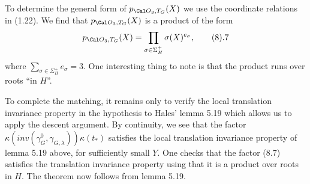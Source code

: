 To determine the general form of
$p_{{\Cal O}_3,T_G}(X)$ we use the coordinate relations in (1.22).
We find that $p_{{\Cal O}_3,T_G}(X)$ is a product of the form
$$
p_{{\Cal O}_3,T_G}(X)=\prod_{\sigma \in\Sigma_H^+}\sigma(X)^{e_\sigma},
\tag 8.7
$$
where $\sum_{\sigma \in\Sigma_H^+}e_\sigma=3$.
One interesting thing to note is that the product runs over roots
``in $H$''. 
\par
To complete the matching, it remains only to 
verify the local translation invariance property in the hypothesis
to Hales' lemma 5.19 which allows us to apply the
descent argument. 
By continuity, we see that the factor
$\kappa(inv(\gamma_G^0,\gamma_{G,\lambda}))\kappa(t_*)$ satisfies the
local translation invariance property of lemma 5.19 above, for 
sufficiently small $Y$. One checks that the factor (8.7)
satisfies the translation invariance property using that
it is a product over roots in $H$. The theorem now follows from
lemma 5.19.

\enddocument



